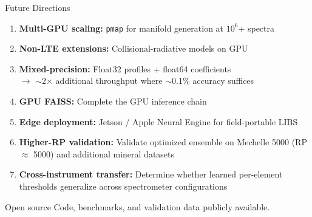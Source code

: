 \documentclass[aspectratio=169,10pt]{beamer}
\begin{document}
\begin{frame}{Future Directions}
	\begin{enumerate}
		\item \textbf{Multi-GPU scaling:} \texttt{pmap} for manifold generation at $10^6$+ spectra
		\item \textbf{Non-LTE extensions:} Collisional-radiative models on GPU
		\item \textbf{Mixed-precision:} Float32 profiles + float64 coefficients\\
		      $\to$ $\sim$2$\times$ additional throughput where $\sim$0.1\% accuracy suffices
		\item \textbf{GPU FAISS:} Complete the GPU inference chain
		\item \textbf{Edge deployment:} Jetson / Apple Neural Engine for field-portable LIBS
		\item \textbf{Higher-RP validation:} Validate optimized ensemble on Mechelle 5000
		      (RP $\approx$ 5000) and additional mineral datasets
		\item \textbf{Cross-instrument transfer:} Determine whether learned per-element
		      thresholds generalize across spectrometer configurations
	\end{enumerate}

	\vspace{1em}
	\begin{block}{Open source}
		Code, benchmarks, and validation data publicly available.
	\end{block}
\end{frame}
\end{document}
